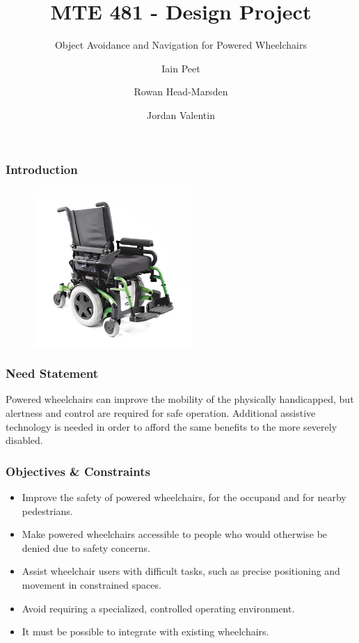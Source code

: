 \documentclass{beamer}
\title{MTE 481 - Design Project}
\subtitle{Object Avoidance and Navigation for Powered Wheelchairs}
\author{Iain Peet \and Rowan Head-Marsden \and Jordan Valentin}
\begin{document}
\begin{frame}
  \titlepage
\end{frame}

\begin{frame}
  \frametitle{Introduction}
  \begin{figure}
    \centering
    \includegraphics[width=6cm]{wheelchair.jpg} 
  \end{figure}
\end{frame}

\begin{frame}
  \frametitle{Need Statement}
  Powered wheelchairs can improve the mobility of the physically handicapped, but 
  alertness and control are required for safe operation.
  Additional assistive technology is needed in order to afford the same benefits
  to the more severely disabled.
\end{frame}

\begin{frame}
  \frametitle{Objectives \& Constraints}
  \begin{itemize}
    \item Improve the safety of powered wheelchairs, for the occupand and for nearby pedestrians. \\
    \item Make powered wheelchairs accessible to people who would otherwise be denied due to safety concerns. \\
    \item Assist wheelchair users with difficult tasks, such as precise positioning and movement in constrained spaces.  \\
    \item Avoid requiring a specialized, controlled operating environment. \\
    \item It must be possible to integrate with existing wheelchairs. \\
  \end{itemize}
\end{frame}
\end{document}
